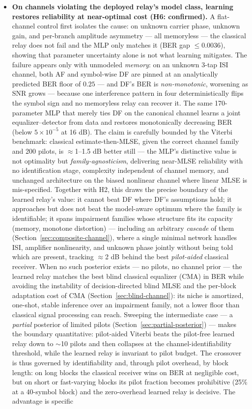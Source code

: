 \begin{itemize}
\tightlist
\item
  \textbf{On channels violating the deployed relay's model class, learning restores reliability at near-optimal cost (H6: confirmed).} A flat-channel control first isolates the cause: on unknown carrier phase, unknown gain, and per-branch amplitude asymmetry --- all memoryless --- the classical relay does not fail and the MLP only matches it (BER gap $\leq 0.0036$), showing that parameter uncertainty alone is not what learning mitigates. The failure appears only with unmodeled \emph{memory}: on an unknown 3-tap ISI channel, both AF and symbol-wise DF are pinned at an analytically predicted BER floor of $0.25$ --- and DF's BER is \emph{non-monotonic}, worsening as SNR grows --- because one interference pattern in four deterministically flips the symbol sign and no memoryless relay can recover it. The same 170-parameter MLP that merely ties DF on the canonical channel learns a joint equalizer--detector from data and restores monotonically decreasing BER (below $5\times10^{-5}$ at 16 dB). The claim is carefully bounded by the Viterbi benchmark: classical estimate-then-MLSE, given the correct channel family and 200 pilots, is $\approx$1--1.5 dB better still --- the MLP's distinctive value is not optimality but \emph{family-agnosticism}, delivering near-MLSE reliability with no identification stage, complexity independent of channel memory, and unchanged architecture on the biased nonlinear channel where linear MLSE is mis-specified. Together with H2, this draws the precise boundary of the learned relay's value: it cannot beat DF where DF's assumptions hold; it approaches but does not beat the model-aware optimum where the family is identifiable; it spans impairment families whose structure fits its capacity (memory, monotone distortion) --- including an arbitrary \emph{cascade} of them (Section~\ref{sec:composite-channel}), where a single minimal network handles ISI, amplifier nonlinearity, and unknown phase jointly without being told which are present, tracking $\approx$2 dB behind the best \emph{pilot-aided} classical receiver. When no such posterior exists --- no pilots, no channel prior --- the learned relay matches the best blind classical equalizer (CMA) in BER while avoiding the instability of decision-directed blind MLSE and the per-block adaptation cost of CMA (Section~\ref{sec:blind-channel}): its niche is amortized, one-shot, stable inference over an impairment family, not a lower floor than classical signal processing can reach. Sweeping the intermediate case --- a \emph{partial} posterior of limited pilots (Section~\ref{sec:partial-posterior}) --- makes the boundary quantitative: pilot-aided Viterbi beats the pilot-free learned relay down to $\sim$10 pilots and then collapses at the channel-identifiability threshold, while the learned relay is invariant to pilot budget. The crossover is thus governed by identifiability and, through pilot overhead, by block length: on long blocks the classical receiver wins on BER at negligible cost, but on short or fast-varying blocks its pilot fraction becomes prohibitive (25\% at a 40-symbol block) and the zero-overhead learned relay is decisive. The advantage is specific 
\end{itemize}
